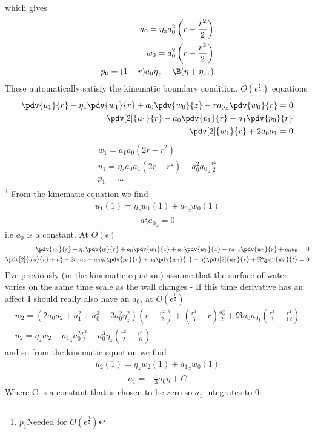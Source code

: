 \documentclass[12pt]{article}
\newcommand{\rt}{^{\frac{1}{2}}}
\newcommand{\rtt}{^{\frac{3}{2}}}
\begin{document}
which gives 
\begin{align}
u_0 = \eta_za_0^2\left(r-\frac{r^2}{2}\right)\\
w_0 = a_0^2\left(r-\frac{r^2}{2}\right)\\
p_0=(1-r)a_0\eta_z-\B(\eta+\eta_{zz})
\end{align}
These automatically satisfy the kinematic boundary condition.
$O(\epsilon\rt)$ equations
\begin{align}
	\pdv{u_1}{r}-\eta_z\pdv{w_1}{r}+ a_0\pdv{w_0}{z}- r{a_0}_z\pdv{w_0}{r}= 0 \\
	\pdv[2]{u_1}{r}-a_0\pdv{p_1}{r}-a_1\pdv{p_0}{r}\\
	\pdv[2]{w_1}{r}+2a_0a_1 = 0\\
\end{align}
\begin{align}
w_1 = a_1a_0(2r - r^2)\\
u_1 = \eta_z a_0 a_1(2r-r^2)- a_0^2{a_0}_z\frac{r^2}{2}\\
p_1 = ...
\end{align}\footnote{$p_1$Needed for $O(\epsilon\rtt)$}
From the kinematic equation we find
\begin{align}
u_1(1) = \eta_z w_1(1) + {a_0}_z w_0(1)\end{align}
\begin{align}
a_0^2{a_0}_z = 0 
\end{align}
i.e $a_0$ is a constant.
 At $O(\epsilon)$
 \begin{align}
 \pdv{u_2}{r}-\eta_z\pdv{w}{r}+a_0\pdv{w_1}{z}+a_1\pdv{w_0}{z}-r{a_1}_z\pdv{w_0}{r}+a_0u_0=0\\
 \pdv[2]{w_2	}{r}+a_1^2+2a_0a_2+a_0\eta_z\pdv{p_0}{r}+a_0\pdv{w_0}{r}+\eta_z^2\pdv[2]{w_0}{r}+\Re\pdv{w_0}{t}=0
 \end{align}
 I've previously (in the kinematic equation) assume that the surface of water varies on the same time scale as the wall changes - If this time derivative has an affect I should really also have an ${a_0}_t$ at $O(\epsilon\rt)$
 \begin{align}
 w_2 = \left(  2a_0a_2+a_1^2+a_0^3-2a_0^2\eta_z^2\right)\left(r-\frac{r^2}{2}\right)+\left(\frac{r^3}{3} - r\right)\frac{a_0^3}{2}+\Re a_0{a_0}_t\left(\frac{r^3}{3}-\frac{r^4}{12}\right)\\
 u_2 = \eta_z w_2-{a_1}_za_0^2\frac{r^2}{2}-a_0^3\eta_z\left(\frac{r^2}{2}-\frac{r^3}{6}\right)
 \end{align}
 and so from the kinematic equation we find
 \begin{align}
 u_2(1) = \eta_z w_2(1) + {a_1}_z w_0(1)
 \end{align}
 \begin{align}
 a_1 = -\frac{1}{3}a_0\eta+ C
 \end{align}
 Where C is a constant that is chosen to be zero so $a_1$ integrates to 0.
\end{document}
